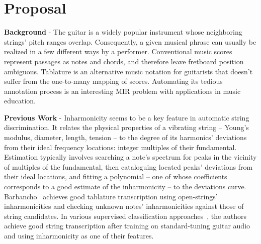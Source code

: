 \documentclass[12pt]{cmuthesis}
\begin{document}

%
%
%
%
%
\chapter{Proposal}
\noindent
\textbf{Background} - The guitar is a widely popular instrument whose neighboring strings' pitch ranges overlap. Consequently, a given musical phrase can usually be realized in a few different ways by a performer. Conventional music scores represent passages as notes and chords, and therefore leave fretboard position ambiguous. Tablature is an alternative music notation for guitarists that doesn't suffer from the one-to-many mapping of scores. Automating its tedious annotation process is an interesting MIR problem with applications in music education.

\noindent
\textbf{Previous Work} - Inharmonicity seems to be a key feature in automatic string discrimination. It relates the physical properties of a vibrating string -- Young's modulus, diameter, length, tension -- to the degree of its harmonics' deviations from their ideal frequency locations: integer multiples of their fundamental. Estimation typically involves searching a note's spectrum for peaks in the vicinity of multiples of the fundamental, then cataloguing located peaks' deviations from their ideal locations, and fitting a polynomial -- one of whose coefficients corresponds to a good estimate of the inharmonicity -- to the deviations curve. Barbancho~\cite{barbanchoi2012} achieves good tablature transcription using open-strings' inharmonicities and checking unknown notes' inharmonicities against those of string candidates. In various supervised classification approaches~\cite{abesser2012, kehling2014, dittmar2013}, the authors achieve good string transcription after training on standard-tuning guitar audio and using inharmonicity as one of their features.
\end{document}
